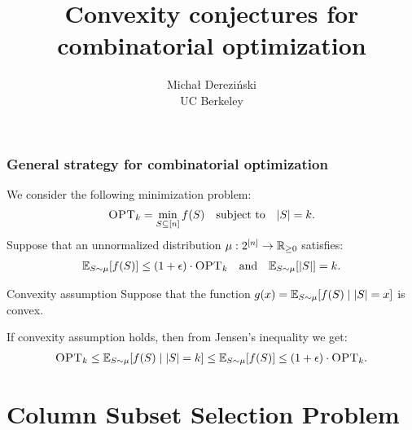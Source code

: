 \documentclass[10pt]{beamer}
\title[]{Convexity conjectures for combinatorial optimization}
\author[]{Micha{\l} Derezi\'{n}ski\\
UC Berkeley}
\begin{document}
\begin{frame}
  \titlepage
\end{frame}

\linespread{1.3}

\begin{frame}
\frametitle{General strategy for combinatorial optimization}
We consider the following minimization problem:
\begin{align*}
  {\textsc{OPT}_k}=\min_{S\subseteq[n]}f(S)\quad\text{subject to}\quad |S|=k.
\end{align*}
\pause
Suppose that an unnormalized distribution $\mu:2^{[n]}\rightarrow\mathbb R_{\geq 0}$
satisfies:
\begin{align*}
  \mathbb E_{S\sim\mu}[f(S)]\leq (1+\epsilon)\cdot{\textsc{OPT}_k}\quad
  \text{and}\quad \mathbb E_{S\sim \mu}[|S|] = k.
\end{align*}
\pause
\vspace{-3mm}
\begin{block}{Convexity assumption}
Suppose that  the function  $g(x) = \mathbb E_{S\sim\mu}[f(S)\mid |S|=x]$
is convex.
\end{block}
\vspace{4mm}
\pause
If convexity assumption holds, then from Jensen's inequality we get:
\begin{align*}
  {\textsc{OPT}_k}\leq\mathbb E_{S\sim\mu}[f(S)\mid |S|=k] \leq \mathbb E_{S\sim\mu}[f(S)]
  \leq(1+\epsilon)\cdot{\textsc{OPT}_k}.
\end{align*}
\end{frame}

\section{Column Subset Selection Problem}
\end{document}
